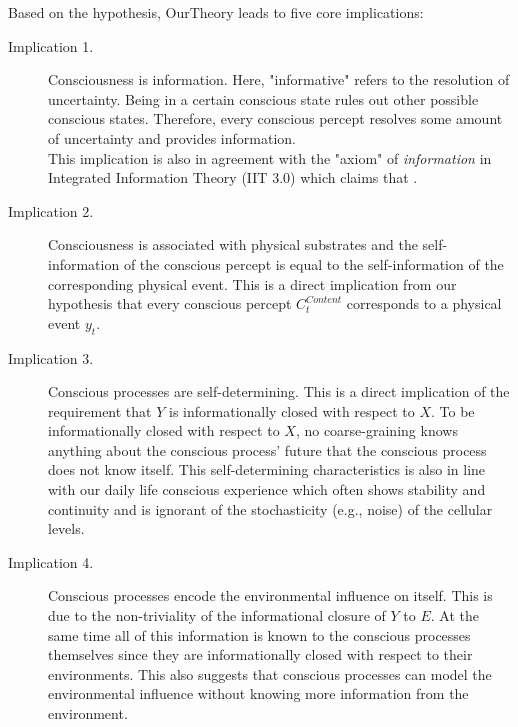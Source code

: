 \documentclass[utf8]{article}
\begin{document}
        Based on the hypothesis, \ac{OurTheory} leads to five core implications: 
        \begin{description}
            \item[Implication 1.] 
            Consciousness is information. Here, "informative" refers to the resolution of uncertainty. Being in a certain conscious state rules out other possible conscious states. Therefore, every conscious percept resolves some amount of uncertainty and provides information. \\ 
            This implication is also in agreement with the "axiom" of \textit{information} in Integrated Information Theory (IIT 3.0) which claims that  \citep[p.2]{oizumi2014phenomenology}.
            
            \item[Implication 2.] 
            Consciousness is associated with physical substrates and the self-information of the conscious percept is equal to the self-information of the corresponding physical event. This is a direct implication from our hypothesis that every conscious percept $C_t^{Content}$ corresponds to a physical event $y_t$. 
            
            
            \item[Implication 3.] 
            Conscious processes are self-determining. This is a direct implication of the requirement that $Y$ is informationally closed with respect to $X$. To be informationally closed with respect to $X$, no coarse-graining knows anything about the conscious process' future that the conscious process does not know itself. This self-determining characteristics is also in line with our daily life conscious experience which often shows stability and continuity and is ignorant of the stochasticity (e.g., noise) of the cellular levels.
            

            
            \item[Implication 4.] 
            Conscious processes encode the environmental influence on itself. This is due to the non-triviality of the informational closure of $Y$ to $E$. At the same time all of this information is known to the conscious processes themselves since they are informationally closed with respect to their environments. This also suggests that conscious processes can model the environmental influence without knowing more information from the environment.
            

\end{description}
\end{document}
